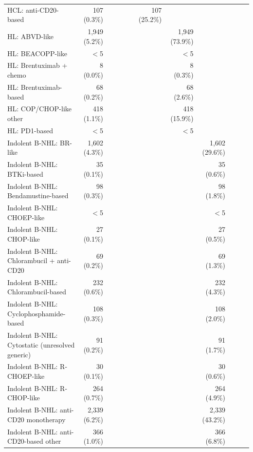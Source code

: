 \begin{table}
{\begin{tabular}{@{}lrrrrrrrrrrr@{}}
\quad HCL: anti-CD20-based & 107 (0.3\%) &  &  &  &  & 107 (25.2\%) &  &  &  &  &  \\
\quad HL: ABVD-like & 1,949 (5.2\%) &  &  &  &  &  & 1,949 (73.9\%) &  &  &  &  \\
\quad HL: BEACOPP-like & $<$5 &  &  &  &  &  & $<$5 &  &  &  &  \\
\quad HL: Brentuximab + chemo & 8 (0.0\%) &  &  &  &  &  & 8 (0.3\%) &  &  &  &  \\
\quad HL: Brentuximab-based & 68 (0.2\%) &  &  &  &  &  & 68 (2.6\%) &  &  &  &  \\
\quad HL: COP/CHOP-like other & 418 (1.1\%) &  &  &  &  &  & 418 (15.9\%) &  &  &  &  \\
\quad HL: PD1-based & $<$5 &  &  &  &  &  & $<$5 &  &  &  &  \\
\quad Indolent B-NHL: BR-like & 1,602 (4.3\%) &  &  &  &  &  &  & 1,602 (29.6\%) &  &  &  \\
\quad Indolent B-NHL: BTKi-based & 35 (0.1\%) &  &  &  &  &  &  & 35 (0.6\%) &  &  &  \\
\quad Indolent B-NHL: Bendamustine-based & 98 (0.3\%) &  &  &  &  &  &  & 98 (1.8\%) &  &  &  \\
\quad Indolent B-NHL: CHOEP-like & $<$5 &  &  &  &  &  &  & $<$5 &  &  &  \\
\quad Indolent B-NHL: CHOP-like & 27 (0.1\%) &  &  &  &  &  &  & 27 (0.5\%) &  &  &  \\
\quad Indolent B-NHL: Chlorambucil + anti-CD20 & 69 (0.2\%) &  &  &  &  &  &  & 69 (1.3\%) &  &  &  \\
\quad Indolent B-NHL: Chlorambucil-based & 232 (0.6\%) &  &  &  &  &  &  & 232 (4.3\%) &  &  &  \\
\quad Indolent B-NHL: Cyclophosphamide-based & 108 (0.3\%) &  &  &  &  &  &  & 108 (2.0\%) &  &  &  \\
\quad Indolent B-NHL: Cytostatic (unresolved generic) & 91 (0.2\%) &  &  &  &  &  &  & 91 (1.7\%) &  &  &  \\
\quad Indolent B-NHL: R-CHOEP-like & 30 (0.1\%) &  &  &  &  &  &  & 30 (0.6\%) &  &  &  \\
\quad Indolent B-NHL: R-CHOP-like & 264 (0.7\%) &  &  &  &  &  &  & 264 (4.9\%) &  &  &  \\
\quad Indolent B-NHL: anti-CD20 monotherapy & 2,339 (6.2\%) &  &  &  &  &  &  & 2,339 (43.2\%) &  &  &  \\
\quad Indolent B-NHL: anti-CD20-based other & 366 (1.0\%) &  &  &  &  &  &  & 366 (6.8\%) &  &  &  \\

\end{tabular}}
\end{table}
